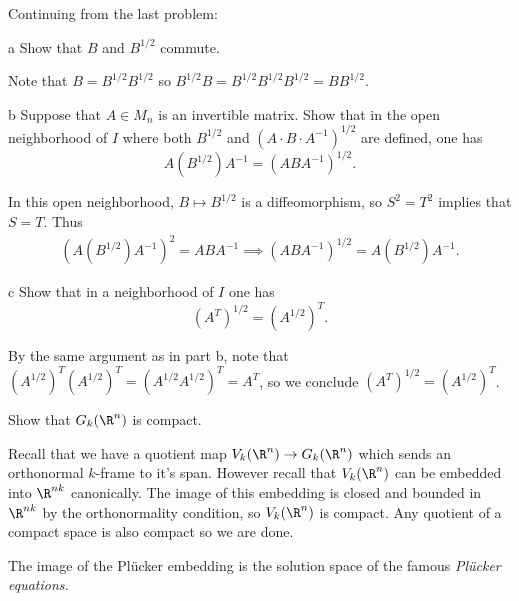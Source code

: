 \documentclass[11pt,letterpaper]{article}
\begin{document}
\begin{solution}
    Continuing from the last problem:
    \begin{partproblem}{a}
        Show that $B$ and $B^{1 /2}$ commute.
    \end{partproblem}

    \quad Note that $B=B^{1 /2}B^{1 /2}$ so $B^{1 /2} B = B^{1 /2}B^{1 /2}B^{1 /2} = BB^{1 /2}$.

    \begin{partproblem}{b}
        Suppose that $A\in M_n$ is an invertible matrix. Show that in the open neighborhood of $I$ where both $B^{1 /2}$ and $(A\cdot B\cdot A^{-1})^{1 /2}$ are defined, one has
        \[
            A(B^{1 /2})A^{-1} = (ABA^{-1})^{1 /2}
        .\]  
    \end{partproblem}

    \quad In this open neighborhood, $B\mapsto B^{1 /2}$ is a diffeomorphism, so $S^2 = T^2$ implies that $S = T$. Thus
    \[
        \begin{aligned}
            (A(B^{1 /2})A^{-1})^2 = ABA^{-1} \implies (ABA^{-1})^{1 /2} = A(B^{1 /2})A^{-1}.
        \end{aligned}
    \]  

    \begin{partproblem}{c}
        Show that in a neighborhood of $I$ one has
        \[
            (A^T)^{1 /2} = (A^{1 / 2})^T
        .\] 
    \end{partproblem}
    \quad By the same argument as in part b, note that $(A^{1 /2})^T(A^{1 /2})^T=(A^{1 /2}A^{1 /2})^T = A^T$, so we conclude $(A^T)^{1 /2} = (A^{1 /2})^T$. 
\end{solution}

\begin{problem}
    Show that $G_k(\R^n)$ is compact. %
\end{problem}

\begin{solution}
    \quad Recall that we have a quotient map $V_k(\R^n) \to G_k(\R^n)$ which sends an orthonormal $k$-frame to it's span. However recall that $V_k(\R^n)$ can be embedded into $\R^{nk}$ canonically. The image of this embedding is closed and bounded in $\R^{nk}$ by the orthonormality condition, so $V_k(\R^n)$ is compact. Any quotient of a compact space is also compact so we are done.
\end{solution}

\begin{problem}
    The image of the Pl\"ucker embedding is the solution space of the famous \emph{Pl\"ucker equations.}
\end{problem}
\end{document}
